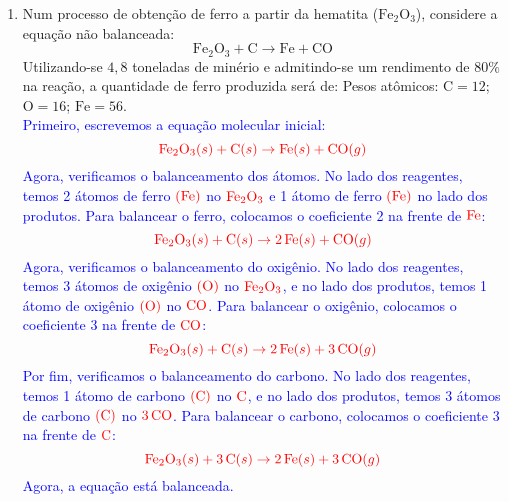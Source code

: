 \documentclass[a4paper, 12pt]{article}
\begin{document}
\begin{enumerate}
    \item Num processo de obtenção de ferro a partir da hematita ($\text{Fe}_{2}\text{O}_{3}$), considere a equação não balanceada:
          \[
              \text{Fe}_{2}\text{O}_{3} + \text{C} \rightarrow \text{Fe} + \text{CO}
          \]
          Utilizando-se $4,8$ toneladas de minério e admitindo-se um rendimento de $80\%$ na reação, a quantidade de ferro produzida será de: Pesos atômicos: $\text{C}= 12$; $\text{O}= 16$; $\text{Fe}= 56$.
          \\[10pt]
          \textcolor{blue}{Primeiro, escrevemos a equação molecular inicial:}
          \[
              \textcolor{red}{\text{Fe}_2\text{O}_3 (s) + \text{C} (s) \rightarrow \text{Fe} (s) + \text{CO} (g)}
          \]
          \textcolor{blue}{Agora, verificamos o balanceamento dos átomos. No lado dos reagentes, temos 2 átomos de ferro \(\textcolor{red}{(\text{Fe})}\) no \(\textcolor{red}{\text{Fe}_2\text{O}_3}\) e 1 átomo de ferro \(\textcolor{red}{(\text{Fe})}\) no lado dos produtos. Para balancear o ferro, colocamos o coeficiente 2 na frente de \(\textcolor{red}{\text{Fe}}\):}
          \[
              \textcolor{red}{\text{Fe}_2\text{O}_3 (s) + \text{C} (s) \rightarrow 2 \, \text{Fe} (s) + \text{CO} (g)}
          \]
          \textcolor{blue}{Agora, verificamos o balanceamento do oxigênio. No lado dos reagentes, temos 3 átomos de oxigênio \(\textcolor{red}{(\text{O})}\) no \(\textcolor{red}{\text{Fe}_2\text{O}_3}\), e no lado dos produtos, temos 1 átomo de oxigênio \(\textcolor{red}{(\text{O})}\) no \(\textcolor{red}{\text{CO}}\). Para balancear o oxigênio, colocamos o coeficiente 3 na frente de \(\textcolor{red}{\text{CO}}\):}
          \[
              \textcolor{red}{\text{Fe}_2\text{O}_3 (s) + \text{C} (s) \rightarrow 2 \, \text{Fe} (s) + 3 \, \text{CO} (g)}
          \]
          \textcolor{blue}{Por fim, verificamos o balanceamento do carbono. No lado dos reagentes, temos 1 átomo de carbono \(\textcolor{red}{(\text{C})}\) no \(\textcolor{red}{\text{C}}\), e no lado dos produtos, temos 3 átomos de carbono \(\textcolor{red}{(\text{C})}\) no \(\textcolor{red}{3 \, \text{CO}}\). Para balancear o carbono, colocamos o coeficiente 3 na frente de \(\textcolor{red}{\text{C}}\):}
          \[
              \textcolor{red}{\text{Fe}_2\text{O}_3 (s) + 3 \, \text{C} (s) \rightarrow 2 \, \text{Fe} (s) + 3 \, \text{CO} (g)}
          \]
          \textcolor{blue}{Agora, a equação está balanceada.}
          \\[10pt]
          \textcolor{blue}{}

\end{enumerate}
\end{document}
